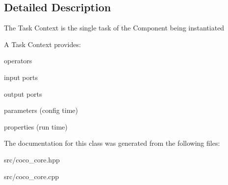 \subsection{Detailed Description}
The Task Context is the single task of the Component being instantiated

A Task Context provides\+:
\begin{DoxyItemize}
\item operators
\item input ports
\item output ports
\item parameters (config time)
\item properties (run time) 
\end{DoxyItemize}

The documentation for this class was generated from the following files\+:\begin{DoxyCompactItemize}
\item 
src/coco\+\_\+core.\+hpp\item 
src/coco\+\_\+core.\+cpp\end{DoxyCompactItemize}
